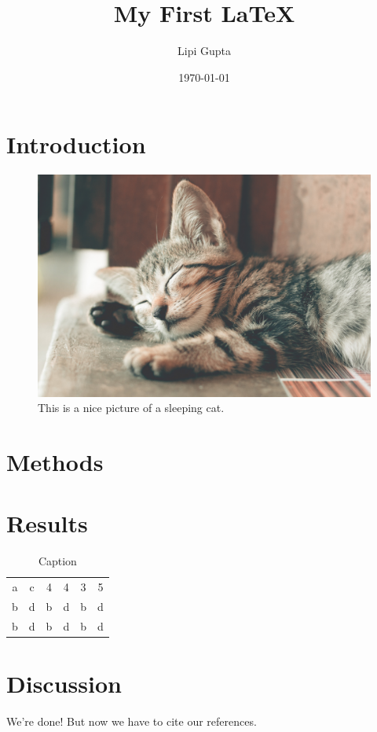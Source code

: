 \documentclass[a4paper]{article}
\begin{document}
\title{My First \LaTeX}
\author{Lipi Gupta}
\date{\today{}}
\maketitle


\section{Introduction}

\lipsum[1-2]


\begin{figure}[h!]
    \centering
    \includegraphics{sleepy_kitty.jpg}
    \caption{This is a nice picture of a sleeping cat.}
    \label{fig:my_label}
\end{figure}


\section{Methods}

\lipsum[3-4]

\section{Results}

\lipsum[5]
\begin{table}[]
    \centering
    \caption{Caption}
    \begin{tabular}{cccccc}
         a & c & 4 & 4 & 3 & 5 \\
         b & d & b & d & b & d \\
         b & d & b & d & b & d
    \end{tabular}
    \label{tab:my_label}
\end{table}


\section{Discussion}

We're done! But now we have to cite our references.
\lipsum[6]
\end{document}
